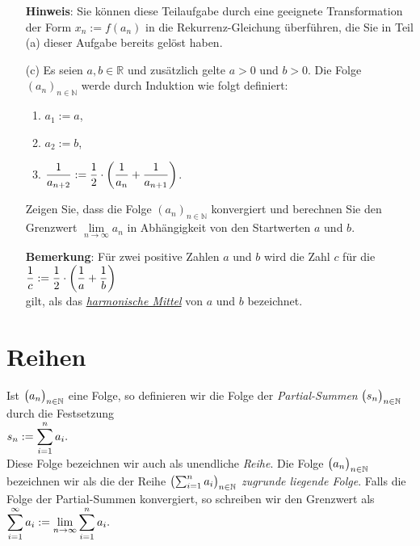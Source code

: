 \begin{enumerate}
           \textbf{Hinweis}: Sie k\"onnen diese Teilaufgabe durch eine geeignete Transformation der
           Form 
           $x_n := f(a_n)$ in die Rekurrenz-Gleichung \"uberf\"uhren, die Sie in Teil (a) dieser Aufgabe
           bereits gel\"ost haben.  

\item[(c)] Es seien $a,b \in \mathbb{R}$ und zus\"atzlich gelte $a > 0$ und $b > 0$.  
           Die Folge $(a_n)_{n\in\mathbb{N}}$ werde durch Induktion wie folgt definiert:
           \begin{enumerate}
           \item $a_1 := a$,
           \item $a_2 := b$,
           \item $\displaystyle\frac{1}{a_{n+2}} := \frac{1}{2} \cdot \left(\frac{1}{a_n} + \frac{1}{a_{n+1}}\right)$.
           \end{enumerate}
           Zeigen Sie, dass die Folge $(a_n)_{n\in\mathbb{N}}$ konvergiert und berechnen Sie den Grenzwert
           $\lim\limits_{n\rightarrow\infty} a_n$ in  Abh\"angigkeit von den Startwerten $a$ und $b$. \eox

           \noindent
           \textbf{Bemerkung}: F\"ur zwei positive Zahlen $a$ und $b$ wird die Zahl $c$ f\"ur die 
           \\[0.2cm]
           \hspace*{1.3cm}
           $\displaystyle\frac{1}{c} := \frac{1}{2} \cdot \left(\frac{1}{a} + \frac{1}{b}\right)$
           \\[0.2cm]
           gilt, als das \href{http://de.wikipedia.org/wiki/Harmonisches_Mittel}{\emph{harmonische Mittel}} von $a$ und $b$ bezeichnet.
\end{enumerate}



\section{Reihen}
\begin{Definition}[Reihe]
Ist $\bigl(a_n\bigr)_{n\in\mathbb{N}}$ eine Folge, so definieren wir die Folge der \emph{Partial-Summen} $\bigl(s_n\bigr)_{n\in\mathbb{N}}$
durch die Festsetzung
\\[0.2cm]
\hspace*{1.3cm}
$\displaystyle s_n := \sum\limits_{i=1}^n a_i. $
\\[0.2cm]
Diese Folge bezeichnen wir auch als unendliche  \emph{Reihe}.  Die Folge $\bigl(a_n\bigr)_{n\in\mathbb{N}}$
bezeichnen wir als die 
der Reihe $\bigl(\sum_{i=1}^n a_i\bigr)_{n\in\mathbb{N}}$ \emph{zugrunde liegende Folge}.
Falls die Folge der Partial-Summen konvergiert, so schreiben wir den Grenzwert als
\\[0.2cm]
\hspace*{1.3cm}
$\displaystyle \sum\limits_{i=1}^\infty a_i := \lim\limits_{n\rightarrow\infty} \sum\limits_{i=1}^n a_i. $
\eod
\end{Definition}

